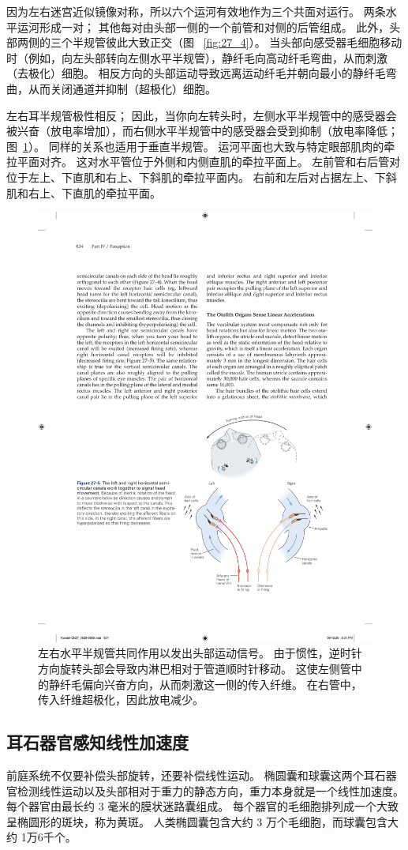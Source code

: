 因为左右迷宫近似镜像对称，所以六个运河有效地作为三个共面对运行。
两条水平运河形成一对； 其他每对由头部一侧的一个前管和对侧的后管组成。
此外，头部两侧的三个半规管彼此大致正交（图 ~\ref{fig:27_4}）。
当头部向感受器毛细胞移动时（例如，向左头部转向左侧水平半规管），静纤毛向高动纤毛弯曲，从而刺激（去极化）细胞。
相反方向的头部运动导致远离运动纤毛并朝向最小的静纤毛弯曲，从而关闭通道并抑制（超极化）细胞。


左右耳半规管极性相反；
因此，当你向左转头时，左侧水平半规管中的感受器会被兴奋（放电率增加），而右侧水平半规管中的感受器会受到抑制（放电率降低；图~\ref{fig:27_5}）。
同样的关系也适用于垂直半规管。
运河平面也大致与特定眼部肌肉的牵拉平面对齐。
这对水平管位于外侧和内侧直肌的牵拉平面上。
左前管和右后管对位于左上、下直肌和右上、下斜肌的牵拉平面内。
右前和左后对占据左上、下斜肌和右上、下直肌的牵拉平面。


\begin{figure}[htbp]
	\centering
	\includegraphics[width=0.6\linewidth]{chap27/fig_27_5}
	\caption{左右水平半规管共同作用以发出头部运动信号。 由于惯性，逆时针方向旋转头部会导致内淋巴相对于管道顺时针移动。 这使左侧管中的静纤毛偏向兴奋方向，从而刺激这一侧的传入纤维。 在右管中，传入纤维超极化，因此放电减少。}
	\label{fig:27_5}
\end{figure}



\subsection{耳石器官感知线性加速度}

前庭系统不仅要补偿头部旋转，还要补偿线性运动。
椭圆囊和球囊这两个耳石器官检测线性运动以及头部相对于重力的静态方向，重力本身就是一个线性加速度。
每个器官由最长约 3 毫米的膜状迷路囊组成。
每个器官的毛细胞排列成一个大致呈椭圆形的斑块，称为黄斑。
人类椭圆囊包含大约 3 万个毛细胞，而球囊包含大约 1万6千个。


